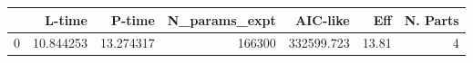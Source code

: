 \begin{tabular}{lrrrrrr}
\toprule
{} &     L-time &     P-time &  N\_params\_expt &    AIC-like &    Eff &  N. Parts \\
\midrule
0 &  10.844253 &  13.274317 &         166300 &  332599.723 &  13.81 &         4 \\
\bottomrule
\end{tabular}
